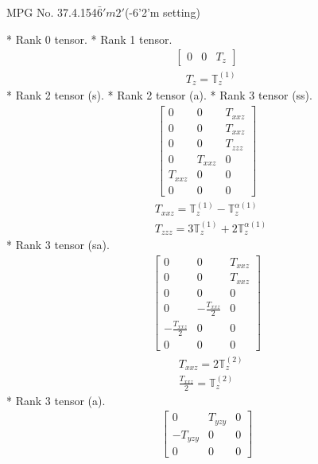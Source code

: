 \documentclass[fleqn,8pt,landscape]{jsarticle}
\begin{document}
\setcounter{MaxMatrixCols}{32}

\renewcommand{\tablename}{Table~}
\renewcommand{\figurename}{Figure~}
\begin{center}
\LARGE
MPG No. 37.4.154\quad$\bar{6}'m2'$\quad(-6'2'm setting)
\end{center}
* Rank 0 tensor.
* Rank 1 tensor.
\begin{align*}
\begin{bmatrix} 0 & 0 & T_{z} \end{bmatrix}
\end{align*}
\begin{align*}
& T_{z} = \mathbb{T}_{z}^{(1)}
\end{align*}
* Rank 2 tensor (s).
* Rank 2 tensor (a).
* Rank 3 tensor (ss).
\begin{align*}
\begin{bmatrix} 0 & 0 & T_{xxz} \\ 0 & 0 & T_{xxz} \\ 0 & 0 & T_{zzz} \\ 0 & T_{xxz} & 0 \\ T_{xxz} & 0 & 0 \\ 0 & 0 & 0 \end{bmatrix}
\end{align*}
\begin{align*}
& T_{xxz} = \mathbb{T}_{z}^{(1)} - \mathbb{T}_{z}^{\alpha(1)} \\
& T_{zzz} = 3 \mathbb{T}_{z}^{(1)} + 2 \mathbb{T}_{z}^{\alpha(1)}
\end{align*}
* Rank 3 tensor (sa).
\begin{align*}
\begin{bmatrix} 0 & 0 & T_{xxz} \\ 0 & 0 & T_{xxz} \\ 0 & 0 & 0 \\ 0 & - \frac{T_{xxz}}{2} & 0 \\ - \frac{T_{xxz}}{2} & 0 & 0 \\ 0 & 0 & 0 \end{bmatrix}
\end{align*}
\begin{align*}
& T_{xxz} = 2 \mathbb{T}_{z}^{(2)} \\
& \frac{T_{xxz}}{2} = \mathbb{T}_{z}^{(2)}
\end{align*}
* Rank 3 tensor (a).
\begin{align*}
\begin{bmatrix} 0 & T_{yzy} & 0 \\ - T_{yzy} & 0 & 0 \\ 0 & 0 & 0 \end{bmatrix}
\end{align*}
\end{document}

